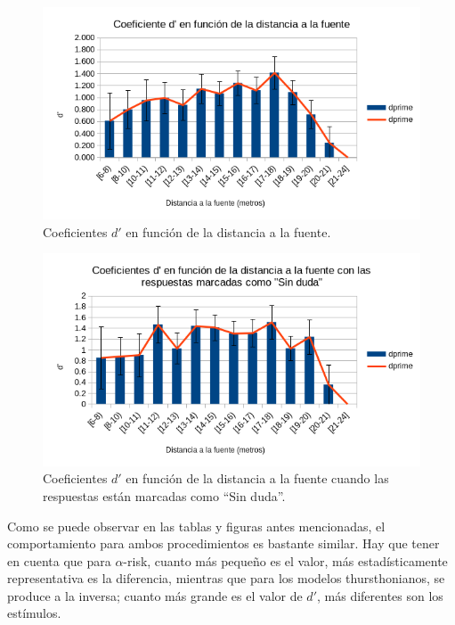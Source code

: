 \documentclass[11pt,a4paper,twoside]{book}
\begin{document}
		    \begin{figure}
                \includegraphics[scale=0.7]{../imagenes/analisisThurstFuenteDuda.png}
			    \centering
			    \caption{Coeficientes $d'$ en función de la distancia a la fuente.} 
			    \label{fig:ThurstFuenteDuda}
            \end{figure}
            
            \begin{figure}
                \includegraphics[scale=0.7]{../imagenes/analisisThurstFuenteSinDuda.png}
			    \centering
			    \caption{Coeficientes $d'$ en función de la distancia a la fuente cuando las respuestas están marcadas como ``Sin duda''.} 
			    \label{fig:ThurstFuenteSinDuda}
            \end{figure}

            Como se puede observar en las tablas y figuras antes mencionadas, el comportamiento para ambos procedimientos es bastante similar. Hay que tener en cuenta que para $\alpha$-risk, cuanto más pequeño es el valor, más estadísticamente representativa es la diferencia, mientras que para los modelos thursthonianos, se produce a la inversa; cuanto más grande es el valor de $d'$, más diferentes son los estímulos.
            
\end{document}
